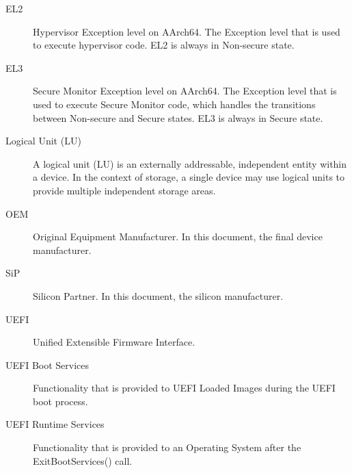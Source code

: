 \documentclass[a4paper,10pt,oneside,english]{sphinxmanual}
\begin{document}
\begin{description}
\item[{EL2\label{\detokenize{abbreviations:term-el2}}}] \leavevmode
Hypervisor Exception level on AArch64. The Exception level that is used to execute
hypervisor code. EL2 is always in Non-secure state.

\item[{EL3\label{\detokenize{abbreviations:term-el3}}}] \leavevmode
Secure Monitor Exception level on AArch64. The Exception level that is used to
execute Secure Monitor code, which handles the transitions between
Non-secure and Secure states.  EL3 is always in Secure state.

\item[{Logical Unit (LU)\label{\detokenize{abbreviations:term-logical-unit-lu}}}] \leavevmode
A logical unit (LU) is an externally addressable, independent entity
within a device. In the context of storage, a single device may use
logical units to provide multiple independent storage areas.

\item[{OEM\label{\detokenize{abbreviations:term-oem}}}] \leavevmode
Original Equipment Manufacturer. In this document, the final device
manufacturer.

\item[{SiP\label{\detokenize{abbreviations:term-sip}}}] \leavevmode
Silicon Partner. In this document, the silicon manufacturer.

\item[{UEFI\label{\detokenize{abbreviations:term-uefi}}}] \leavevmode
Unified Extensible Firmware Interface.

\item[{UEFI Boot Services\label{\detokenize{abbreviations:term-uefi-boot-services}}}] \leavevmode
Functionality that is provided to UEFI Loaded Images during the UEFI boot
process.

\item[{UEFI Runtime Services\label{\detokenize{abbreviations:term-uefi-runtime-services}}}] \leavevmode
Functionality that is provided to an Operating System after the
ExitBootServices() call.

\end{description}
\end{document}
